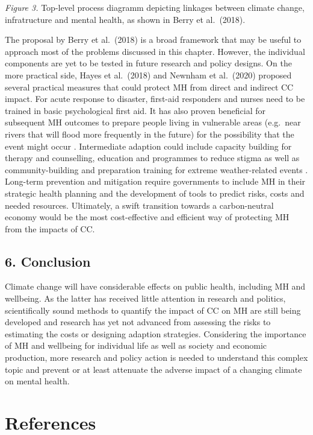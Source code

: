 \documentclass[
]{krantz}
\begin{document}
\emph{Figure 3.} Top-level process diagramm depicting linkages between climate change, infratructure and mental health, as shown in Berry et al.~(2018).

The proposal by Berry et al.~(2018) is a broad framework that may be useful to approach most of the problems discussed in this chapter. However, the individual components are yet to be tested in future research and policy designs.
On the more practical side, Hayes et al.~(2018) and Newnham et al.~(2020) proposed several practical measures that could protect MH from direct and indirect CC impact. For acute response to disaster, first-aid responders and nurses need to be trained in basic psychological first aid. It has also proven beneficial for subsequent MH outcomes to prepare people living in vulnerable areas (e.g.~near rivers that will flood more frequently in the future) for the possibility that the event might occur \citep{munroEffectEvacuationDisplacement2017}. Intermediate adaption could include capacity building for therapy and counselling, education and programmes to reduce stigma as well as community-building and preparation training for extreme weather-related events \citep{newnhamPreparingMentalHealth2020}. Long-term prevention and mitigation require governments to include MH in their strategic health planning and the development of tools to predict risks, costs and needed resources. Ultimately, a swift transition towards a carbon-neutral economy would be the most cost-effective and efficient way of protecting MH from the impacts of CC.

\section{6. Conclusion}\label{conclusion-3}

Climate change will have considerable effects on public health, including MH and wellbeing. As the latter has received little attention in research and politics, scientifically sound methods to quantify the impact of CC on MH are still being developed and research has yet not advanced from assessing the risks to estimating the costs or designing adaption strategies. Considering the importance of MH and wellbeing for individual life as well as society and economic production, more research and policy action is needed to understand this complex topic and prevent or at least attenuate the adverse impact of a changing climate on mental health.

\newpage

\chapter{References}\label{references}
\end{document}
